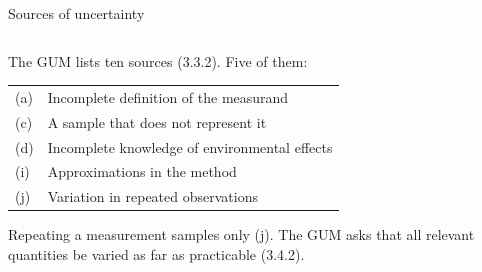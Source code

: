 \documentclass[aspectratio=169,11pt]{beamer}
\begin{document}
\begin{frame}[label=sources]{Sources of uncertainty}
\begin{columns}[T]
\begin{column}{0.52\textwidth}
{\small The GUM lists ten sources (3.3.2). Five of them:}

\vspace{0.2em}
{\footnotesize\renewcommand{\arraystretch}{1.05}
\begin{tabular}{L{0.45cm}L{5.8cm}}
\toprule
(a) & Incomplete definition of the measurand \\
(c) & A sample that does not represent it \\
(d) & Incomplete knowledge of environmental effects \\
(i) & Approximations in the method \\
(j) & Variation in repeated observations \\
\bottomrule
\end{tabular}}

\vspace{0.3em}
{\small Repeating a measurement samples only (j). The GUM asks that all relevant quantities be varied as far as practicable (3.4.2).}
\end{column}
\begin{column}{0.47\textwidth}
\begin{center}
\end{center}
\end{column}
\end{columns}
\end{frame}
\end{document}
